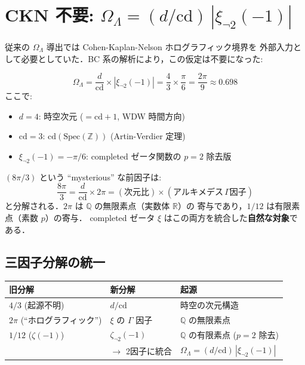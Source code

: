 \documentclass[11pt,a4paper]{article}
\begin{document}
\section{CKN 不要: $\Omega_\Lambda = (d/\mathrm{cd})\,|\xi_{\neg 2}(-1)|$}
\label{sec:omega_formula}

従来の $\Omega_\Lambda$ 導出では Cohen-Kaplan-Nelson ホログラフィック境界を
外部入力として必要としていた．BC 系の解析により，この仮定は不要になった:

\begin{tcolorbox}[colback=blue!5,colframe=blue!50!black,title=新公式]
\begin{equation}
  \Omega_\Lambda = \frac{d}{\mathrm{cd}} \times |\xi_{\neg 2}(-1)|
  = \frac{4}{3} \times \frac{\pi}{6} = \frac{2\pi}{9} \approx 0.698
\end{equation}
ここで:
\begin{itemize}
\item $d = 4$: 時空次元 ($= \mathrm{cd} + 1$, WDW 時間方向)
\item $\mathrm{cd} = 3$: $\mathrm{cd}(\mathrm{Spec}(\mathbb{Z}))$
  (Artin-Verdier 定理)
\item $\xi_{\neg 2}(-1) = -\pi/6$: completed ゼータ関数の $p=2$ 除去版
\end{itemize}
\end{tcolorbox}

\noindent
$(8\pi/3)$ という ``mysterious'' な前因子は:
\begin{equation}
  \frac{8\pi}{3} = \frac{d}{\mathrm{cd}} \times 2\pi
  = (\text{次元比}) \times (\text{アルキメデス}\,\Gamma\text{因子})
\end{equation}
と分解される．$2\pi$ は $\mathbb{Q}$ の無限素点（実数体 $\mathbb{R}$）の
寄与であり，$1/12$ は有限素点（素数 $p$）の寄与．
completed ゼータ $\xi$ はこの両方を統合した\textbf{自然な対象}である．

\subsection{三因子分解の統一}

\begin{center}
\begin{tabular}{lll}
\toprule
旧分解 & 新分解 & 起源 \\
\midrule
$4/3$ (起源不明) & $d/\mathrm{cd}$ & 時空の次元構造 \\
$2\pi$ (``ホログラフィック'') & $\xi$ の $\Gamma$ 因子 & $\mathbb{Q}$ の無限素点 \\
$1/12$ ($\zeta(-1)$) & $\zeta_{\neg 2}(-1)$ & $\mathbb{Q}$ の有限素点 ($p=2$ 除去) \\
\midrule
& $\rightarrow$ 2因子に統合 & $\Omega_\Lambda = (d/\mathrm{cd})\,|\xi_{\neg 2}(-1)|$ \\
\bottomrule
\end{tabular}
\end{center}
\end{document}
